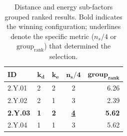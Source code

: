 \begin{table}[!t]
\centering
\footnotesize
\caption{Distance and energy sub-factors grouped ranked results. Bold indicates the winning configuration; underlines denote the specific metric ($n_s/4$ or $\text{group}_{\text{rank}}$) that determined the selection.}
\label{tab:distance_energy_grouped_ranked}
\begin{tabular}{@{}lllcr@{}}
\hline
    \textbf{ID} & $\bm{k_{\text{d}}}$ & $\bm{k_{\text{e}}}$ & $\bm{n_s/4}$ & $\bm{\text{group}_{\text{rank}}}$ \\
\hline
    2.Y.01 & 2 & 2 & 2 & 6.26 \\
    2.Y.02 & 2 & 1 & 3 & 2.39 \\
    \textbf{2.Y.03} & \textbf{1} & \textbf{2} & \textbf{\underline{4}} & \textbf{5.62} \\
    2.Y.04 & 1 & 1 & 3 & 5.62 \\
\hline
\end{tabular}
\end{table}